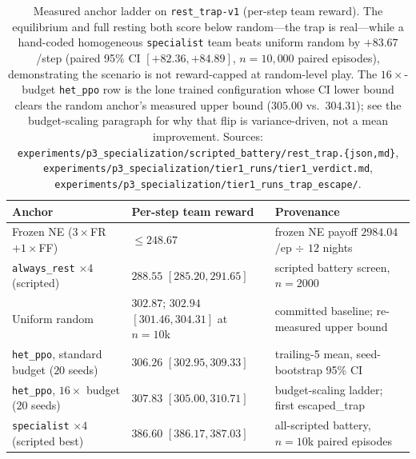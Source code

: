 \documentclass{anvil-paper}
\begin{document}
\begin{table}[h]
  \centering
  \small
  \setlength{\tabcolsep}{5pt}
  \begin{tabular}{lll}
    \toprule
    Anchor & Per-step team reward & Provenance \\
    \midrule
    Frozen NE ($3{\times}$FR$+1{\times}$FF) & $\leq 248.67$
      & frozen NE payoff $2984.04$/ep $\div$ $12$ nights \\
    \texttt{always\_rest} $\times 4$ (scripted) & $288.55$ $[285.20, 291.65]$
      & scripted battery screen, $n{=}2000$ \\
    Uniform random & $302.87$; $302.94$ $[301.46, 304.31]$ at $n{=}10$k
      & committed baseline; re-measured upper bound \\
    \texttt{het\_ppo}, standard budget ($20$ seeds) & $306.26$ $[302.95, 309.33]$
      & trailing-5 mean, seed-bootstrap 95\% CI \\
    \texttt{het\_ppo}, $16{\times}$ budget ($20$ seeds) & $307.83$ $[305.00, 310.71]$
      & budget-scaling ladder; first \textsf{escaped\_trap} \\
    \texttt{specialist} $\times 4$ (scripted best) & $\mathbf{386.60}$ $[386.17, 387.03]$
      & all-scripted battery, $n{=}10$k paired episodes \\
    \bottomrule
  \end{tabular}
  \caption{Measured anchor ladder on \texttt{rest\_trap-v1} (per-step
  team reward). The equilibrium and full resting both score below
  random---the trap is real---while a hand-coded homogeneous
  \texttt{specialist} team beats uniform random by $+83.67$/step
  (paired 95\% CI $[+82.36, +84.89]$, $n{=}10{,}000$ paired episodes),
  demonstrating the scenario is not reward-capped at random-level play.
  The $16{\times}$-budget \texttt{het\_ppo} row is the lone trained
  configuration whose CI lower bound clears the random anchor's
  measured upper bound ($305.00$ vs.\ $304.31$); see the budget-scaling
  paragraph for why that flip is variance-driven, not a mean
  improvement. Sources:
  \texttt{experiments/p3\_specialization/scripted\_battery/rest\_trap.\{json,md\}},
  \texttt{experiments/p3\_specialization/tier1\_runs/tier1\_verdict.md},
  \texttt{experiments/p3\_specialization/tier1\_runs\_trap\_escape/}.}
  \label{tab:trap-anchors}
\end{table}
\end{document}
